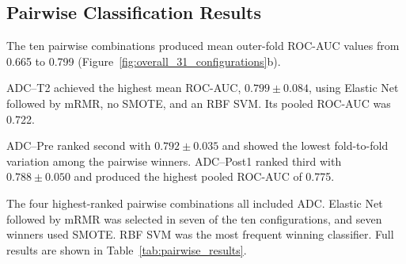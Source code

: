 \documentclass[12pt,twocolumn]{article}
\begin{document}
\subsection{Pairwise Classification Results}
\label{subsec:pairwise_results}

The ten pairwise combinations produced mean outer-fold ROC-AUC values
from 0.665 to 0.799
(Figure~\ref{fig:overall_31_configurations}b).

ADC--T2 achieved the highest mean ROC-AUC,
\(0.799 \pm 0.084\), using Elastic Net followed by mRMR, no SMOTE,
and an RBF SVM. Its pooled ROC-AUC was 0.722.

ADC--Pre ranked second with \(0.792 \pm 0.035\) and showed the lowest
fold-to-fold variation among the pairwise winners. ADC--Post1 ranked
third with \(0.788 \pm 0.050\) and produced the highest pooled
ROC-AUC of 0.775.

The four highest-ranked pairwise combinations all included ADC.
Elastic Net followed by mRMR was selected in seven of the ten
configurations, and seven winners used SMOTE. RBF SVM was the most
frequent winning classifier. Full results are shown in
Table~\ref{tab:pairwise_results}.
\end{document}

